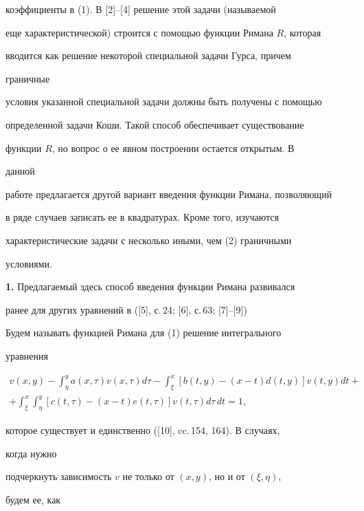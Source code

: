 коэффициенты в (1). В [2]--[4] решение этой задачи (называемой  


еще характеристической) строится с помощью функции Римана $R$, которая  


вводится как решение некоторой специальной задачи Гурса, причем 


граничные  


условия указанной специальной задачи должны быть получены с помощью 


определенной задачи Коши. Такой способ обеспечивает существование  


функции $R$, но вопрос о ее явном построении остается открытым. В 


данной 


работе предлагается другой вариант введения функции Римана, позволяющий 


в ряде случаев записать ее в квадратурах. Кроме того, изучаются  


характеристические задачи с несколько иными, чем (2) граничными  


условиями. 


\medskip 


 


{\bf 1.} Предлагаемый здесь способ введения функции Римана развивался  


ранее для других уравнений в ([5], с.\,24; [6], с.\,63; [7]--[9]) 


 


Будем называть функцией Римана для (1) решение интегрального  


уравнения 


\begin{multline} 


v(x,y)-\int^y_\eta a(x,\tau)v(x,\tau)d\tau-\int^x_\xi 


[b(t,y)-(x-t)d(t,y)]v(t,y)dt+ \\


+\int^x_\xi\int^y_\eta[c(t,\tau)-(x-t)e(t,\tau)] 


v(t,\tau)d\tau\,dt=1, 


\end{multline} 


которое существует и единственно ([10], cc.\,154, 164). В случаях, 


когда нужно 


подчеркнуть зависимость $v$ не только от $(x,y)$, но и от $(\xi,\eta)$, 


будем ее, как  


